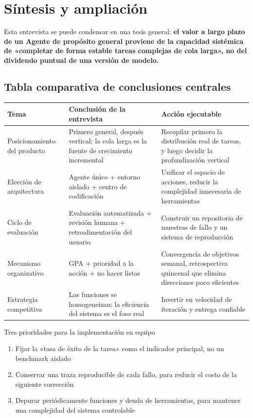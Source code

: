 \section{Síntesis y ampliación}

Esta entrevista se puede condensar en una tesis general: \textbf{el valor a largo plazo de un Agente de propósito general proviene de la capacidad sistémica de «completar de forma estable tareas complejas de cola larga», no del dividendo puntual de una versión de modelo.}

\subsection{Tabla comparativa de conclusiones centrales}

\begin{center}
\begin{tabular}{p{3.4cm}p{5.1cm}p{5.3cm}}
\toprule
Tema & Conclusión de la entrevista & Acción ejecutable \\
\midrule
Posicionamiento del producto & Primero general, después vertical; la cola larga es la fuente de crecimiento incremental & Recopilar primero la distribución real de tareas, y luego decidir la profundización vertical \\
Elección de arquitectura & Agente único + entorno aislado + centro de codificación & Unificar el espacio de acciones, reducir la complejidad innecesaria de herramientas \\
Ciclo de evaluación & Evaluación automatizada + revisión humana + retroalimentación del usuario & Construir un repositorio de muestras de fallo y un sistema de reproducción \\
Mecanismo organizativo & GPA + prioridad a la acción + no hacer listas & Convergencia de objetivos semanal, retrospectiva quincenal que elimina direcciones poco eficientes \\
Estrategia competitiva & Las funciones se homogeneizan; la eficiencia del sistema es el foso real & Invertir en velocidad de iteración y entrega confiable \\
\bottomrule
\end{tabular}
\end{center}

\begin{importantbox}{Tres prioridades para la implementación en equipo}
\begin{enumerate}
    \item Fijar la «tasa de éxito de la tarea» como el indicador principal, no un benchmark aislado
    \item Conservar una traza reproducible de cada fallo, para reducir el costo de la siguiente corrección
    \item Depurar periódicamente funciones y deuda de herramientas, para mantener una complejidad del sistema controlable
\end{enumerate}
\end{importantbox}

